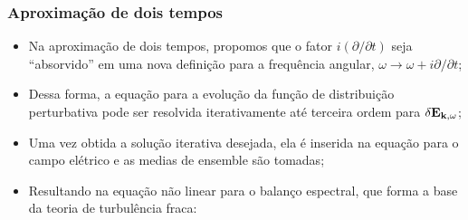 \documentclass[10pt,aspectratio=1610,lualatex]{beamer}
\begin{document}
\begin{frame}
  \frametitle{Aproximação de dois tempos}
  \begin{itemize}
      \item Na aproximação de dois tempos, propomos que o fator
      $i(\partial/\partial t)$ seja ``absorvido'' em uma nova
      definição para a frequência angular, $\omega \rightarrow
      \omega+i \partial/\partial t$;
      \vspace{0.25cm}
      \pause
      \item Dessa forma, a equação para a evolução da função de
      distribuição perturbativa pode ser resolvida iterativamente
      até terceira ordem para $\delta {\bf E}_{{\bf k},\omega}$;
      \vspace{0.25cm}
      \pause
      \item Uma vez obtida a solução iterativa desejada, ela é
        inserida na equação para o campo elétrico e as medias de
        ensemble são tomadas;
      \vspace{0.25cm}
      \pause
      \item Resultando na equação não linear para o balanço espectral,
      que forma a base da teoria de turbulência fraca:
  \end{itemize}
\end{frame}
\end{document}
